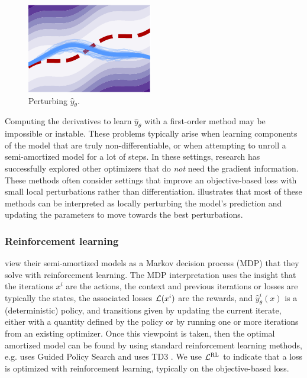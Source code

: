 \documentclass[twoside,11pt]{article}
\newcommand{\eg}{e.g.\xspace}
\begin{document}
\begin{figure}
\vspace{3mm}
\includegraphics[width=\linewidth]{fig/learning-rl.pdf}
\caption{Perturbing $\hat y_\theta$.}
\vspace{-3mm}
\label{fig:perturbing}
\end{figure}

Computing the derivatives to learn $\hat y_\theta$ with a
first-order method may be impossible or instable.
These problems typically arise when learning components
of the model that are truly non-differentiable, or
when attempting to unroll a semi-amortized model for
a lot of steps.
In these settings, research has successfully explored
other optimizers that do \emph{not} need the gradient information.
These methods often consider settings that improve
an objective-based loss with small local perturbations
rather than differentiation.
 illustrates that most of these
methods can be interpreted as locally perturbing the
model's prediction and updating the parameters to
move towards the best perturbations.

\subsubsection{Reinforcement learning}
\citet{li2016learning,li2017learning,ichnowski2021accelerating} view their
semi-amortized models as a Markov decision process (MDP)
that they solve with reinforcement learning.
The MDP interpretation uses the insight
that the iterations $x^i$ are the actions,
the context and previous iterations or losses are typically the states,
the associated losses ${\mathcal{L}}(x^i)$ are the rewards,
and $\hat y_\theta^i(x)$ is a (deterministic) policy,
and transitions given by updating the current iterate,
either with a quantity defined by the policy or by running
one or more iterations from an existing optimizer.
Once this viewpoint is taken, then the optimal amortized model
can be found by using standard reinforcement learning methods,
\eg \citet{li2016learning,li2017learning} uses Guided Policy Search \citep{levine2013guided}
and \citet{ichnowski2021accelerating} uses TD3 \citep{fujimoto2018td3}.
We use ${\mathcal{L}}^{\rm RL}$ to indicate that a loss is optimized with reinforcement learning,
typically on the objective-based loss.
\end{document}
